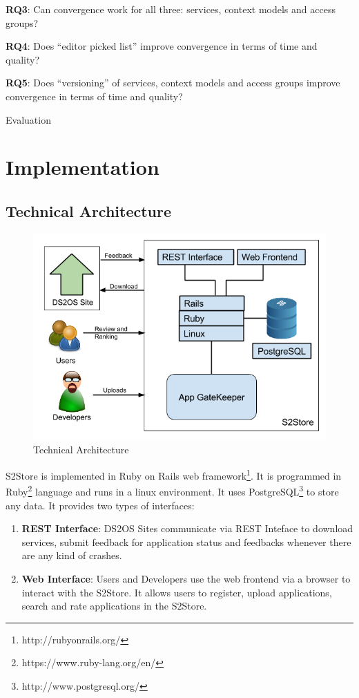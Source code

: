\textbf{RQ3}: Can convergence work for all three: services, context models and access groups?

\textbf{RQ4}: Does ``editor picked list'' improve convergence in terms of time and quality?

\textbf{RQ5}: Does ``versioning'' of services, context models and access groups improve convergence in terms of time and quality?

Evaluation

\section{Implementation}

\subsection{Technical Architecture}

\begin{figure}[!htb]
  \centering
  \includegraphics[width=14cm]{figures/technical_architecture.png}
  \caption{Technical Architecture}
  \label{fig:technical-architecture}
\end{figure}

S2Store is implemented in Ruby on Rails web framework\footnote{http://rubyonrails.org/}. It is programmed in Ruby\footnote{https://www.ruby-lang.org/en/} language and runs in a linux environment. It uses PostgreSQL\footnote{http://www.postgresql.org/} to store any data. It provides two types of interfaces:

\begin{enumerate}
  \item \textbf{REST Interface}: DS2OS Sites communicate via REST Inteface to download services, submit feedback for application status and feedbacks whenever there are any kind of crashes.
  \item \textbf{Web Interface}: Users and Developers use the web frontend via a browser to interact with the S2Store. It allows users to register, upload applications, search and rate applications in the S2Store.
\end{enumerate}

